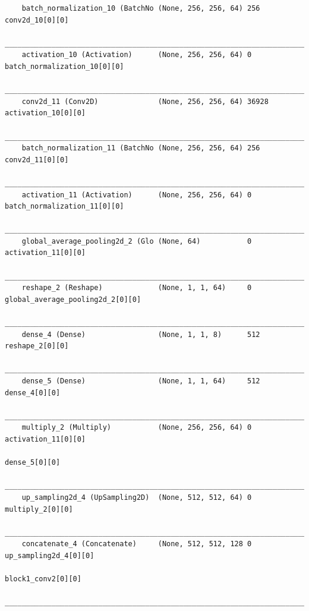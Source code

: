 {\begin{verbatim}
    batch_normalization_10 (BatchNo (None, 256, 256, 64) 256         conv2d_10[0][0]                  
    __________________________________________________________________________________________________
    activation_10 (Activation)      (None, 256, 256, 64) 0           batch_normalization_10[0][0]     
    __________________________________________________________________________________________________
    conv2d_11 (Conv2D)              (None, 256, 256, 64) 36928       activation_10[0][0]              
    __________________________________________________________________________________________________
    batch_normalization_11 (BatchNo (None, 256, 256, 64) 256         conv2d_11[0][0]                  
    __________________________________________________________________________________________________
    activation_11 (Activation)      (None, 256, 256, 64) 0           batch_normalization_11[0][0]     
    __________________________________________________________________________________________________
    global_average_pooling2d_2 (Glo (None, 64)           0           activation_11[0][0]              
    __________________________________________________________________________________________________
    reshape_2 (Reshape)             (None, 1, 1, 64)     0           global_average_pooling2d_2[0][0] 
    __________________________________________________________________________________________________
    dense_4 (Dense)                 (None, 1, 1, 8)      512         reshape_2[0][0]                  
    __________________________________________________________________________________________________
    dense_5 (Dense)                 (None, 1, 1, 64)     512         dense_4[0][0]                    
    __________________________________________________________________________________________________
    multiply_2 (Multiply)           (None, 256, 256, 64) 0           activation_11[0][0]              
                                                                        dense_5[0][0]                    
    __________________________________________________________________________________________________
    up_sampling2d_4 (UpSampling2D)  (None, 512, 512, 64) 0           multiply_2[0][0]                 
    __________________________________________________________________________________________________
    concatenate_4 (Concatenate)     (None, 512, 512, 128 0           up_sampling2d_4[0][0]            
                                                                        block1_conv2[0][0]               
    __________________________________________________________________________________________________

\end{verbatim}}
